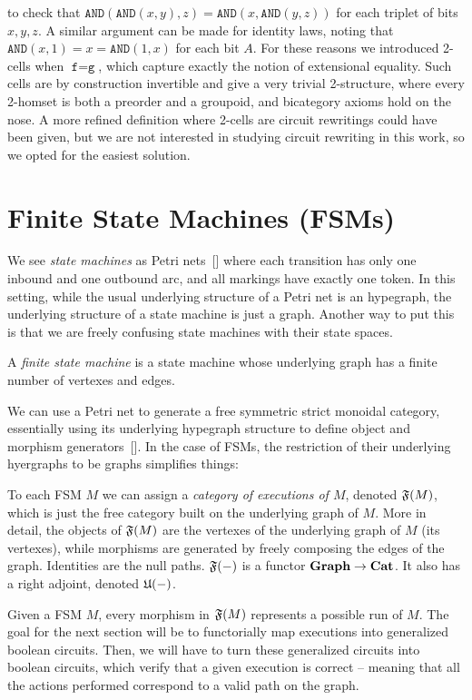 \documentclass[submission,copyright,creativecommons,sharealike,noncommercial]{eptcs}
\begin{document}
to check that 
$\texttt{AND}(\texttt{AND}(x,y),z) = \texttt{AND}(x,\texttt{AND}(y,z))$
for each triplet of bits $x, y, z$. A similar argument can be made for identity 
laws, noting that $\texttt{AND}(x, 1) = x = \texttt{AND}(1,x)$ for each 
bit $A$. For these reasons we introduced 
2-cells when $\texttt{f} = \texttt{g}$, which capture exactly 
the notion of extensional equality. Such cells are by construction invertible 
and give a very trivial 2-structure, where every 2-homset is both 
a preorder and a groupoid, and bicategory axioms hold on the nose.
A more refined definition 
where 2-cells are circuit rewritings could have been given, 
but we are not interested in studying circuit rewriting in this 
work, so we opted for the easiest solution.
%
%
%
\section{Finite State Machines (FSMs)}\label{sec: finite state machines}
We see \emph{state machines} as Petri nets~[] where 
each transition has only one inbound and one outbound arc, 
and all markings have exactly one token. In this setting, while 
the usual underlying structure of a Petri net is an hypegraph,
the underlying structure of a state machine is just 
a graph. Another way to put this is that we are freely 
confusing state machines with their state spaces.
%
%
\begin{definition}
  A \emph{finite state machine} is a state machine whose
  underlying graph has a finite number of vertexes and edges.
\end{definition}
%
We can use a Petri net to generate a free symmetric strict monoidal 
category, essentially using its underlying hypegraph structure to define 
object and morphism generators~[]. In the case of FSMs, the restriction 
of their underlying hyergraphs to be graphs simplifies things:
%
%
\begin{definition}
  To each FSM $M$ we can assign a \emph{category of executions 
  of $M$}, denoted $\mathfrak{F}(M)$, which is just the free category built 
  on the underlying graph of $M$. More in detail, the objects of $\mathfrak{F}(M)$
  are the vertexes of the underlying graph of $M$ (its vertexes), while morphisms 
  are generated by freely composing the edges of the graph. 
  Identities are the null paths. $\mathfrak{F}(-)$ is a functor $\textbf{Graph} \to \textbf{Cat}$. 
  It also has a right adjoint, denoted $\mathfrak{U}(-)$.
\end{definition}
%
Given a FSM $M$, every morphism in $\mathfrak{F}(M)$ represents a possible 
run of $M$. The goal for the next section will be to functorially map 
executions into generalized boolean circuits. Then, we will have to turn 
these generalized circuits into boolean circuits, which verify that a given 
execution is correct -- meaning that all the actions performed correspond to a valid path
on the graph. 
%
%
\end{document}
